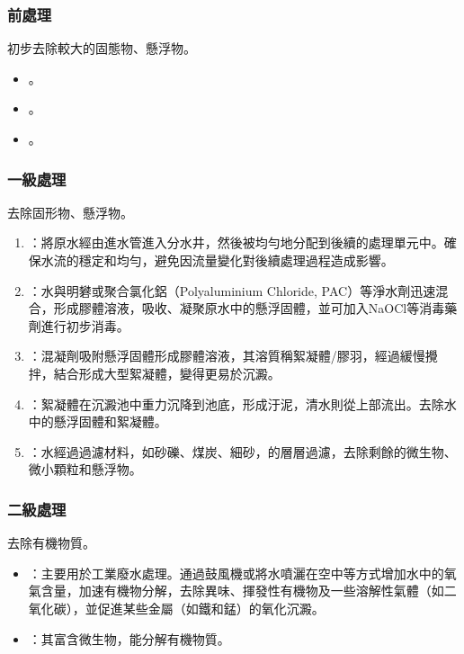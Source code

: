 \documentclass[a4paper,12pt]{report}
\begin{document}
\begin{itemize}
\subsubsection{前處理}
初步去除較大的固態物、懸浮物。
\begin{itemize}
\item {}。
\item {}。
\item {}。
\end{itemize}
\subsubsection{一級處理}
去除固形物、懸浮物。
\begin{enumerate}
\item {}：將原水經由進水管進入分水井，然後被均勻地分配到後續的處理單元中。確保水流的穩定和均勻，避免因流量變化對後續處理過程造成影響。
\item {}：水與明礬或聚合氯化鋁（Polyaluminium Chloride, PAC）等淨水劑迅速混合，形成膠體溶液，吸收、凝聚原水中的懸浮固體，並可加入NaOCl等消毒藥劑進行初步消毒。
\item {}：混凝劑吸附懸浮固體形成膠體溶液，其溶質稱絮凝體/膠羽，經過緩慢攪拌，結合形成大型絮凝體，變得更易於沉澱。
\item {}：絮凝體在沉澱池中重力沉降到池底，形成汙泥，清水則從上部流出。去除水中的懸浮固體和絮凝體。
\item {}：水經過過濾材料，如砂礫、煤炭、細砂，的層層過濾，去除剩餘的微生物、微小顆粒和懸浮物。
\end{enumerate}
\subsubsection{二級處理}
去除有機物質。
\begin{itemize}
\item {}：主要用於工業廢水處理。通過鼓風機或將水噴灑在空中等方式增加水中的氧氣含量，加速有機物分解，去除異味、揮發性有機物及一些溶解性氣體（如二氧化碳），並促進某些金屬（如鐵和錳）的氧化沉澱。
\item {}：其富含微生物，能分解有機物質。
\end{itemize}

\end{itemize}
\end{document}
